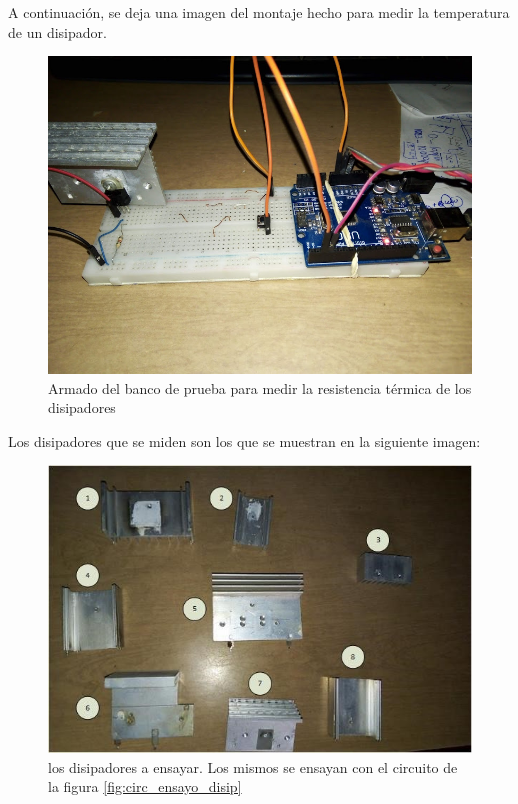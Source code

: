 A continuación, se deja una imagen del montaje hecho para medir la temperatura de un disipador. 

\begin{figure}[ht!]
	\includegraphics[scale=0.5]{prueba_disipadores_lm}
	\caption{Armado del banco de prueba para medir la resistencia térmica de los disipadores}
\end{figure}

Los disipadores que se miden son los que se muestran en la siguiente imagen: 

\begin{figure}[ht!]
	\includegraphics{disipadores_a_ensayar}
	\caption{los disipadores a ensayar. Los mismos se ensayan con el circuito de la figura \ref{fig:circ_ensayo_disip}}
	\label{fig:img_disip_num}
\end{figure}



